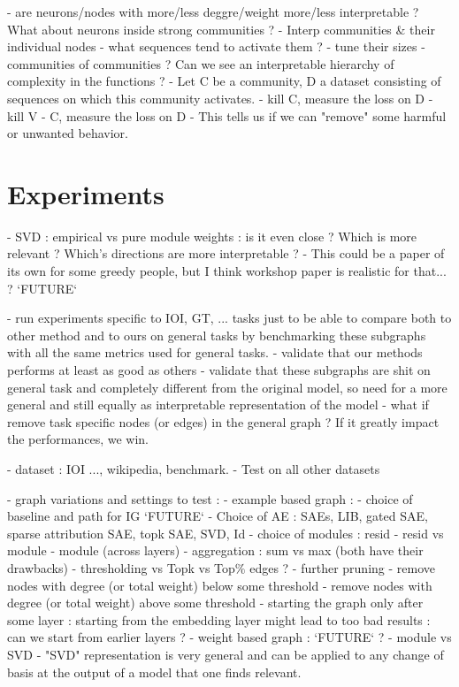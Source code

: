 \documentclass{article}
\begin{document}
- are neurons/nodes with more/less deggre/weight more/less interpretable ? What about neurons inside strong communities ?
- Interp communities & their individual nodes
    - what sequences tend to activate them ?
    - tune their sizes
    - communities of communities ? Can we see an interpretable hierarchy of complexity in the functions ?
- Let C be a community, D a dataset consisting of sequences on which this community activates.
    - kill C, measure the loss on D
    - kill V - C, measure the loss on D
    - This tells us if we can "remove" some harmful or unwanted behavior.

\section{Experiments}

- SVD : empirical vs pure module weights : is it even close ? Which is more relevant ? Which's directions are more interpretable ?
    - This could be a paper of its own for some greedy people, but I think workshop paper is realistic for that... ? `FUTURE`

- run experiments specific to IOI, GT, ... tasks just to be able to compare both to other method and to ours on general tasks by benchmarking these subgraphs with all the same metrics used for general tasks.
    - validate that our methods performs at least as good as others
    - validate that these subgraphs are shit on general task and completely different from the original model, so need for a more general and still equally as interpretable representation of the model
    - what if remove task specific nodes (or edges) in the general graph ? If it greatly impact the performances, we win.

- dataset : IOI ..., wikipedia, benchmark.
    - Test on all other datasets

- graph variations and settings to test :
    - example based graph :
        - choice of baseline and path for IG `FUTURE`
        - Choice of AE : SAEs, LIB, gated SAE, sparse attribution SAE, topk SAE, SVD, Id
        - choice of modules : resid - resid vs module - module (across layers)
        - aggregation : sum vs max (both have their drawbacks)
        - thresholding vs Topk vs Top$\%$ edges ?
        - further pruning
            - remove nodes with degree (or total weight) below some threshold
            - remove nodes with degree (or total weight) above some threshold
            - starting the graph only after some layer : starting from the embedding layer might lead to too bad results : can we start from earlier layers ?
    - weight based graph :
    `FUTURE` ?
        - module vs SVD
            - "SVD" representation is very general and can be applied to any change of basis at the output of a model that one finds relevant.
\end{document}
